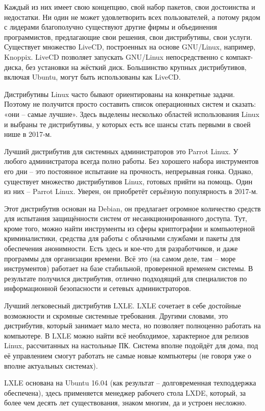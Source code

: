 Каждый из них имеет свою концепцию, свой набор пакетов, свои достоинства и недостатки. Ни один не может удовлетворить всех пользователей, а потому рядом с лидерами благополучно существуют другие фирмы и объединения программистов, предлагающие свои решения, свои дистрибутивы, свои услуги. Существует множество LiveCD, построенных на основе GNU/Linux, например, Knoppix. LiveCD позволяет запускать GNU/Linux непосредственно с компакт-диска, без установки на жёсткий диск. Большинство крупных дистрибутивов, включая Ubuntu, могут быть использованы как LiveCD.

Дистрибутивы Linux часто бывают ориентированы на конкретные задачи. Поэтому не получится просто составить список операционных систем и сказать: «они – самые лучшие». Здесь выделены несколько областей использования Linux и выбраны те дистрибутивы, у которых есть все шансы стать первыми в своей нише в 2017-м.~\cite{linuxDistr}

Лучший дистрибутив для системных администраторов это Parrot Linux. У любого администратора всегда полно работы. Без хорошего набора инструментов его дни – это постоянное испытание на прочность, непрерывная гонка. Однако, существует множество дистрибутивов Linux, готовых прийти на помощь. Один из них – Parrot Linux. Уверен, он приобретёт серьёзную популярность в 2017-м.

Этот дистрибутив основан на Debian, он предлагает огромное количество средств для испытания защищённости систем от несанкционированного доступа. Тут, кроме того, можно найти инструменты из сферы криптографии и компьютерной криминалистики, средства для работы с облачными службами и пакеты для обеспечения анонимности. Есть здесь и кое-что для разработчиков, и даже программы для организации времени. Всё это (на самом деле, там – море инструментов) работает на базе стабильной, проверенной временем системы. В результате получился дистрибутив, отлично подходящий для специалистов по информационной безопасности и сетевых администраторов.

Лучший легковесный дистрибутив LXLE.  LXLE сочетает в себе достойные возможности и скромные системные требования. Другими словами, это дистрибутив, который занимает мало места, но позволяет полноценно работать на компьютере. В LXLE можно найти всё необходимое, характерное для релизов Linux, рассчитанных на настольные ПК. Система вполне подойдёт для дома, под её управлением смогут работать не самые новые компьютеры (не говоря уже о вполне актуальных системах).

LXLE основана на Ubuntu 16.04 (как результат – долговременная техподдержка обеспечена), здесь применяется менеджер рабочего стола LXDE, который, за более чем десять лет существования, знаком многим, да и устроен несложно.

